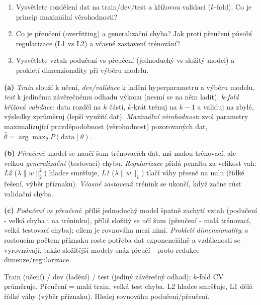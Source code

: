 \begin{zadani}
\begin{enumerate}[label=(\alph*)]
  \item {} Vysvětlete rozdělení dat na train/dev/test a křížovou validaci ($k$-fold). Co je princip maximální věrohodnosti?
  \item {} Co je přeučení (overfitting) a generalizační chyba? Jak proti přeučení působí regularizace (L1 vs L2) a včasné zastavení trénování?
  \item {} Vysvětlete vztah podučení vs přeučení (jednoduchý vs složitý model) a prokletí dimenzionality při výběru modelu.
\end{enumerate}
\end{zadani}

\begin{reseni}
\textbf{(a)} \emph{Train} slouží k učení, \emph{dev/validace} k ladění hyperparametru a výběru modelu, \emph{test} k jedinému závěrečnému odhadu výkonu (nesmí se na něm ladit). \emph{$k$-fold křížová validace}: data rozděl na $k$ částí, $k$-krát trénuj na $k{-}1$ a validuj na zbylé, výsledky zprůměruj (lepší využití dat). \emph{Maximální věrohodnost}: zvol parametry maximalizující pravděpodobnost (věrohodnost) pozorovaných dat, $\hat\theta=\arg\max_\theta P(\text{data}\mid\theta)$.

\textbf{(b)} \emph{Přeučení}: model se naučí šum trénovacích dat, má malou trénovací, ale velkou \emph{generalizační} (testovací) chybu. \emph{Regularizace} přidá penaltu za velikost vah: \emph{L2} ($\lambda\lVert w\rVert_2^2$) hladce smršťuje, \emph{L1} ($\lambda\lVert w\rVert_1$) tlačí váhy přesně na nulu (řídké řešení, výběr příznaku). \emph{Včasné zastavení}: trénink se ukončí, když začne růst validační chyba.

\textbf{(c)} \emph{Podučení vs přeučení}: příliš jednoduchý model špatně zachytí vztah (podučení - velká chyba i na tréninku), příliš složitý se učí šum (přeučení - malá trénovací, velká testovací chyba); cílem je rovnováha mezi nimi. \emph{Prokletí dimenzionality}: s rostoucím počtem příznaku roste potřeba dat exponenciálně a vzdálenosti se vyrovnávají, takže složitější modely snáz přeučí - proto redukce dimenze/regularizace.
\end{reseni}

\begin{jadro}
Train (učení) / dev (ladění) / test (jediný závěrečný odhad); $k$-fold CV průměruje. Přeučení = malá train, velká test chyba. L2 hladce smršťuje, L1 dělá řídké váhy (výběr příznaku). Hledej rovnováhu podučení/přeučení.
\end{jadro}

